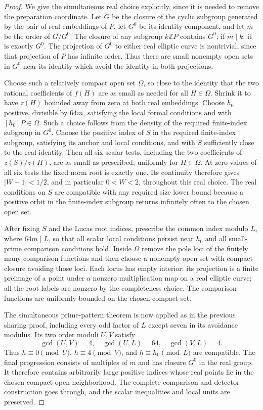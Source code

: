 \begin{proof}
We give the simultaneous real choice explicitly, since it is needed
to remove the preparation coordinate.  Let $G$ be the closure of
the cyclic subgroup generated by the pair of real embeddings of
$P$, let $G^0$ be its identity component, and let $m$ be the order
of $G/G^0$.  The closure of any subgroup $k\mathbb ZP$ contains
$G^0$; if $m\mid k$, it is exactly $G^0$.  The projection of
$G^0$ to either real elliptic curve is nontrivial, since that
projection of $P$ has infinite order.  Thus there are small
nonempty open sets in $G^0$ near its identity which avoid the
identity in both projections.

Choose such a relatively compact open set $\Omega$, so close to
the identity that the two rational coefficients of $f(H)$ are
as small as needed for all $H\in\Omega$.  Shrink it to have
$z(H)$ bounded away from zero at both real embeddings.  Choose
$h_0$ positive, divisible by $64m$, satisfying the local formal
conditions and with $[h_0]P\in\Omega$.  Such a choice follows
from the density of the required finite-index subgroup in $G^0$.
Choose the positive index of $S$ in the required finite-index
subgroup, satisfying its anchor and local conditions, and with
$S$ sufficiently close to the real identity.  Then all six scalar
tests, including the two coefficients of $z(S)/z(H)$, are as small
as prescribed, uniformly for $H\in\Omega$.  At zero values of
all six tests the fixed norm root is exactly one.  Its continuity
therefore gives $|W-1|<1/2$, and in particular $0<W<2$, throughout
this real choice.  The real
conditions on $S$ are compatible with any required size lower
bound because a positive orbit in the finite-index subgroup
returns infinitely often to the chosen open set.

After fixing $S$ and the Lucas root indices, prescribe the common
index modulo $L$, where $64m\mid L$, so that all scalar local
conditions persist near $h_0$ and all small-prime comparison
conditions hold.  Inside $\Omega$ remove the pole loci of the
finitely many comparison functions and then choose a nonempty
open set with compact closure avoiding those loci.  Each locus
has empty interior: its projection is a finite preimage of a
point under a nonzero multiplication map on a real elliptic
curve; all the root labels are nonzero by the completeness choice.
The comparison functions are uniformly bounded on the
chosen compact set.

The simultaneous prime-pattern theorem is now applied as in the
previous sharing proof, including every odd factor of $L$ except
seven in its avoidance modulus.  Its two order moduli $U,V$
satisfy
\[
 \gcd(U,V)=4,\quad \gcd(U,L)=64,\quad \gcd(V,L)=4.
\]
Thus $h\equiv0\pmod U$, $h\equiv4\pmod V$, and
$h\equiv h_0\pmod L$ are compatible.  The final progression
consists of multiples of $m$ and has closure $G^0$ in the real
group.  It therefore contains arbitrarily large positive indices
whose real points lie in the chosen compact-open neighborhood.
The complete comparison and detector construction goes through,
and the scalar inequalities and local units are preserved.


\end{proof}
